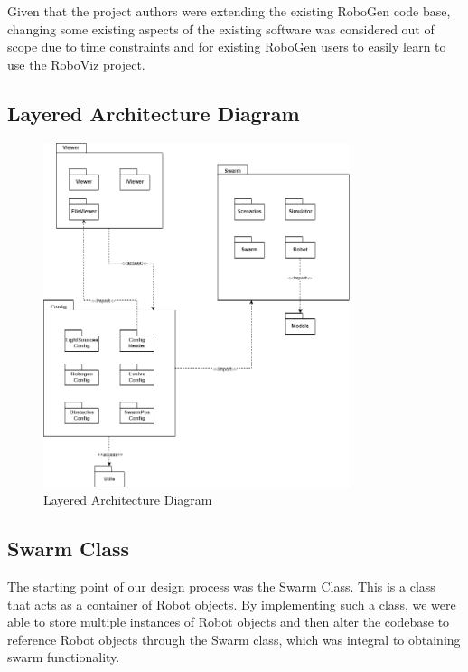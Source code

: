 \documentclass[11pt,a4paper]{article}
\begin{document}
Given that the project authors were extending the existing RoboGen
\cite{robogen} code base, changing some existing aspects of the existing
software was considered out of scope due to time constraints and for existing
RoboGen users to easily learn to use the RoboViz project.


\subsection{Layered Architecture Diagram}

\begin{figure}[htpb]
    \centering
    \includegraphics[width=0.8\textwidth]{PK}
    \caption{Layered Architecture Diagram}
    \label{fig:layered-architecture-diagram}
\end{figure}

\subsection{Swarm Class}
The starting point of our design process was the Swarm Class.
This is a class that acts as a container of Robot objects. By implementing such a class,
we were able to store multiple instances of Robot objects and then alter the codebase to
reference Robot objects through the Swarm class, which was integral to obtaining swarm functionality.
\end{document}
